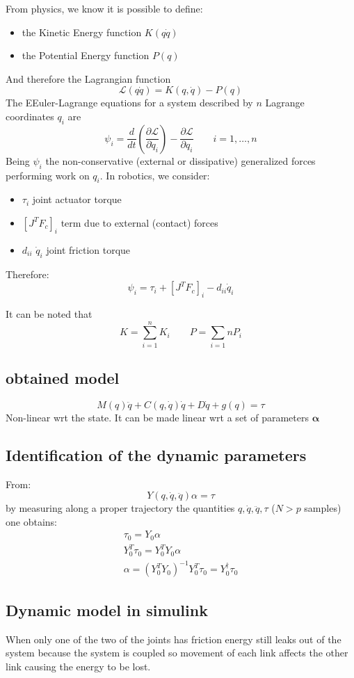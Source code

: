 \documentclass{book}
\begin{document}
From physics, we know it is possible to define:
\begin{itemize}
    \item the Kinetic Energy function $K(q\dot{q})$
    \item the Potential Energy function $P(q)$
\end{itemize}
And therefore the Lagrangian function 
\[
    \mathcal{L}(q\dot{q})=K(q,\dot{q})-P(q)
\]
The EEuler-Lagrange equations for a system described by $n$ Lagrange coordinates $q_i$ are
\[
    \psi_i=\frac{d}{dt}\left(\frac{\partial \mathcal{L}}{\partial \dot{q}_i}\right) - \frac{\partial \mathcal{L}}{\partial q_i} \qquad i=1,\dots,n
\]
Being $\psi_i$ the non-conservative (external or dissipative) generalized forces performing work on $q_i$. In robotics, we consider:
\begin{itemize}
    \item $\tau_i$ joint actuator torque
    \item $[J^TF_c]_i$ term due to external (contact) forces
    \item $d_{ii}$ $\dot{q}_i$ joint friction torque
\end{itemize}
Therefore:
\[
    \psi_i=\tau_i+[J^TF_c]_i-d_{ii}\dot{q}_i
\]

It can be noted that
\[
    K=\sum_{i=1}^{n}K_i \qquad P=\sum_{i=1}{n}P_i
\]

\subsection{obtained model}
\[
    M(q)\ddot{q} + C(q,\dot{q})\dot{q}+D\dot{q}+g(q)=\tau
\]
Non-linear wrt the state. It can be made linear wrt a set of parameters $\mathbf{\alpha}$

\subsection{Identification of the dynamic parameters}
From:
\[
    Y(q,\dot{q},\ddot{q})\alpha = \tau
\]
by measuring along a proper trajectory the quantities $q,\dot{q},\ddot{q}, \tau$ ($N>p$ samples) one obtains:
\begin{gather*}
    \tau_0=Y_0\alpha\\
    Y_0^T\tau_0 = Y_0^TY_0\alpha\\
    \alpha = (Y_0^TY_0)^{-1}Y_0^T\tau_0=Y_0^\dag \tau_0
\end{gather*}
\subsection{Dynamic model in simulink}
When only one of the two of the joints has friction energy still leaks out of the system because the system is coupled so movement of each link affects the other link causing the energy to be lost.
\end{document}
